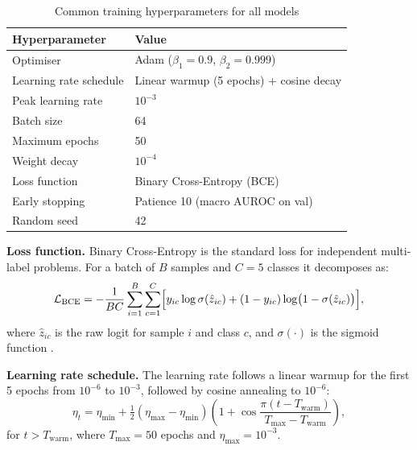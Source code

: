 \begin{table}[htbp]
  \centering
  \caption{Common training hyperparameters for all models}
  \label{tab:training}
  \begin{tabular}{ll}
    \hline
    \textbf{Hyperparameter} & \textbf{Value}                           \\
    \hline
    Optimiser               & Adam ($\beta_1{=}0.9$, $\beta_2{=}0.999$) \\
    Learning rate schedule  & Linear warmup (5 epochs) + cosine decay  \\
    Peak learning rate      & $10^{-3}$                                \\
    Batch size              & 64                                       \\
    Maximum epochs          & 50                                       \\
    Weight decay            & $10^{-4}$                                \\
    Loss function           & Binary Cross-Entropy (BCE)               \\
    Early stopping          & Patience 10 (macro AUROC on val)         \\
    Random seed             & 42                                       \\
    \hline
  \end{tabular}
\end{table}

\noindent \textbf{Loss function.}
Binary Cross-Entropy is the standard loss for independent multi-label
problems.
For a batch of $B$ samples and $C = 5$ classes it decomposes as:
\begin{equation}
  \mathcal{L}_{\mathrm{BCE}} =
    -\frac{1}{BC}\sum_{i=1}^{B}\sum_{c=1}^{C}
    \Bigl[
      y_{ic}\log\sigma(\hat{z}_{ic})
      + (1 - y_{ic})\log\bigl(1 - \sigma(\hat{z}_{ic})\bigr)
    \Bigr],
  \label{eq:bce}
\end{equation}
where $\hat{z}_{ic}$ is the raw logit for sample $i$ and class $c$,
and $\sigma(\cdot)$ is the sigmoid function \cite{ref19,ref24}.

\noindent \textbf{Learning rate schedule.}
The learning rate follows a linear warmup for the first 5 epochs from
$10^{-6}$ to $10^{-3}$, followed by cosine annealing to $10^{-6}$:
\begin{equation}
  \eta_t =
    \eta_{\min}
    + \tfrac{1}{2}(\eta_{\max} - \eta_{\min})
    \left(1 + \cos\!\frac{\pi(t - T_{\mathrm{warm}})}{T_{\max} - T_{\mathrm{warm}}}\right),
  \label{eq:cosine}
\end{equation}
for $t > T_{\mathrm{warm}}$, where $T_{\max} = 50$ epochs and
$\eta_{\max} = 10^{-3}$.

